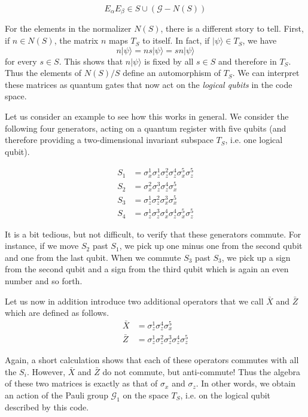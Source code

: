 \documentclass[a4paper, draft]{article}
\theoremstyle{own}
\theoremstyle{remark}
\begin{document}
$$
E_\alpha E_\beta \in S \cup (\mathcal{G} - N(S))
$$

For the elements in the normalizer $N(S)$, there is a different story to tell. First, if $n \in N(S)$, the matrix $n$ maps $T_S$ to itself. In fact, if $|\psi\rangle  \in T_S$, we have
$$
n |\psi\rangle = n s |\psi \rangle = s n | \psi \rangle
$$
for every $s \in S$. This shows that $n |\psi \rangle$ is fixed by all $s \in S$ and therefore in $T_S$. Thus the elements of $N(S) / S$ define an automorphism of $T_S$. We can interpret these matrices as quantum gates that now act on the \emph{logical qubits} in the code space.

Let us consider an example to see how this works in general. We consider the following four generators, acting on a quantum register with five qubits (and therefore providing a two-dimensional invariant subspace $T_S$, i.e. one logical qubit).

\begin{align*}
S_1 &= \sigma_x^1 \sigma_z^1 \sigma_z^2 \sigma_z^4 \sigma_x^5 \sigma_z^5 \\
S_2 &= \sigma_x^2 \sigma_z^3 \sigma_z^4 \sigma_x^5 \\
S_3 &= \sigma_z^1 \sigma_z^2 \sigma_x^3  \sigma_x^5 \\
S_4 &= \sigma_z^1 \sigma_z^3 \sigma_x^4 \sigma_z^4 \sigma_x^5 \sigma_z^5
\end{align*}

It is a bit tedious, but not difficult, to verify that these generators commute. For instance, if we move $S_2$ past $S_1$, we pick up one minus one from the second qubit and one from the last qubit. When we commute $S_3$ past $S_3$, we pick up a sign from the second qubit and  a sign from the third qubit which is again an even number and so forth. 

Let us now in addition introduce two additional operators that we call $\bar{X}$ and $\bar{Z}$ which are defined as follows.
\begin{align*}
\bar{X} &= \sigma_z^1 \sigma_z^4 \sigma_x^5 \\
\bar{Z} &= \sigma_z^1 \sigma_z^2 \sigma_z^3 \sigma_z^4 \sigma_z^5
\end{align*}

Again, a short calculation shows that each of these operators commutes with all the $S_i$. However, $\bar{X}$ and $\bar{Z}$ do not commute, but anti-commute! Thus the algebra of these two matrices is exactly as that of $\sigma_x$ and $\sigma_z$. In other words, we obtain an action of the Pauli group $\mathcal{G}_1$ on the space $T_S$, i.e. on the logical qubit described by this code.
\end{document}
